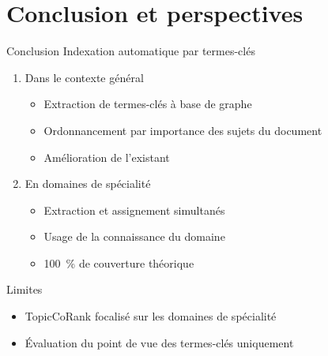 \section{Conclusion et perspectives}
%
%

  \begin{frame}{Conclusion}
    Indexation automatique par termes-clés
    \begin{enumerate}
      \item{Dans le contexte général}
      \begin{itemize}
        \item{Extraction de termes-clés à base de graphe}
        \item{Ordonnancement par importance des sujets du document}
        \item{Amélioration de l'existant}
      \end{itemize}
      \item{En domaines de spécialité}
      \begin{itemize}
        \item{Extraction et assignement simultanés}
        \item{Usage de la connaissance du domaine}
        \item{100~\% de couverture théorique}
      \end{itemize}
    \end{enumerate}

    \vspace{1em}

    \begin{alertblock}{Limites}
      \begin{itemize}
        \item{TopicCoRank focalisé sur les domaines de spécialité}
        \item{Évaluation du point de vue des termes-clés uniquement}
      \end{itemize}
    \end{alertblock}    
  \end{frame}

